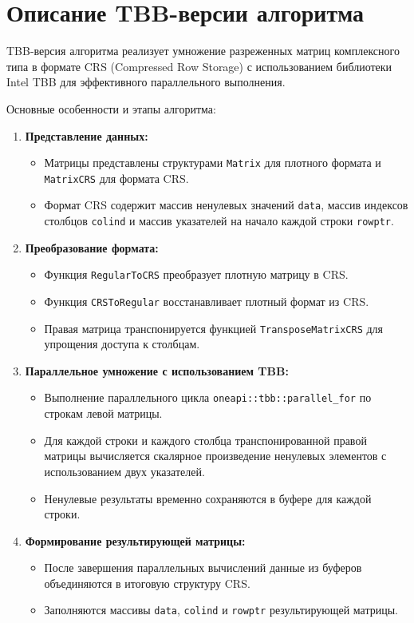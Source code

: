 \documentclass[a4paper,12pt]{article}
\begin{document}
\newpage

\section{Описание TBB-версии алгоритма}

TBB-версия алгоритма реализует умножение разреженных матриц комплексного типа в формате CRS (Compressed Row Storage) с использованием библиотеки Intel TBB для эффективного параллельного выполнения.

Основные особенности и этапы алгоритма:

\begin{enumerate}
  \item \textbf{Представление данных:}
  \begin{itemize}
    \item Матрицы представлены структурами \texttt{Matrix} для плотного формата и \texttt{MatrixCRS} для формата CRS.
    \item Формат CRS содержит массив ненулевых значений \texttt{data}, массив индексов столбцов \texttt{colind} и массив указателей на начало каждой строки \texttt{rowptr}.
  \end{itemize}

  \item \textbf{Преобразование формата:}
  \begin{itemize}
    \item Функция \texttt{RegularToCRS} преобразует плотную матрицу в CRS.
    \item Функция \texttt{CRSToRegular} восстанавливает плотный формат из CRS.
    \item Правая матрица транспонируется функцией \texttt{TransposeMatrixCRS} для упрощения доступа к столбцам.
  \end{itemize}

  \item \textbf{Параллельное умножение с использованием TBB:}
  \begin{itemize}
    \item Выполнение параллельного цикла \texttt{oneapi::tbb::parallel\_for} по строкам левой матрицы.
    \item Для каждой строки и каждого столбца транспонированной правой матрицы вычисляется скалярное произведение ненулевых элементов с использованием двух указателей.
    \item Ненулевые результаты временно сохраняются в буфере для каждой строки.
  \end{itemize}

  \item \textbf{Формирование результирующей матрицы:}
  \begin{itemize}
    \item После завершения параллельных вычислений данные из буферов объединяются в итоговую структуру CRS.
    \item Заполняются массивы \texttt{data}, \texttt{colind} и \texttt{rowptr} результирующей матрицы.
  \end{itemize}
\end{enumerate}
\end{document}
